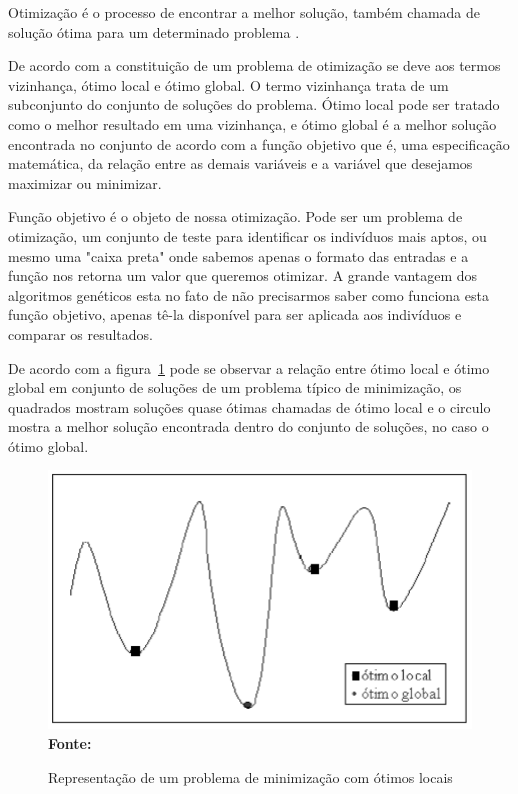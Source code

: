 

Otimização é o processo de encontrar a melhor solução, também chamada de solução ótima para um determinado problema \cite{timoteo2005desenvolvimento}.\par

De acordo com \cite{steiglitz1982combinatorial} a constituição de um problema de otimização se deve aos termos vizinhança, ótimo local e ótimo global. O termo vizinhança trata de um subconjunto do conjunto de soluções do problema. Ótimo local pode ser tratado como o melhor resultado em uma vizinhança, e ótimo global é a melhor solução encontrada no conjunto de acordo com a função objetivo que é, uma especificação matemática, da relação entre as demais variáveis e a variável que desejamos maximizar ou minimizar.\par

Função objetivo é o objeto de nossa otimização. Pode ser um problema de otimização, um conjunto de teste para identificar os indivíduos mais aptos, ou mesmo uma "caixa preta" onde sabemos apenas o formato das entradas e a função nos retorna um valor que queremos otimizar. A grande vantagem dos algoritmos genéticos esta no fato de não precisarmos saber como funciona esta função objetivo, apenas tê-la disponível para ser aplicada aos indivíduos e comparar os resultados.

De acordo com a figura~\ref{fig:representacaoLocal}  pode se observar a relação entre ótimo local e ótimo global em conjunto de soluções de um problema típico de minimização, os quadrados mostram soluções quase ótimas chamadas de ótimo local e o circulo mostra a melhor solução encontrada dentro do conjunto de soluções, no caso o ótimo global.\par

\begin{figure}[!htb]
\caption[Representação de um problema de minimização com ótimos locais]{Representação de um problema de minimização com ótimos locais}
\label{fig:representacaoLocal}
\centering
\includegraphics[scale=0.55]{imagens/problemaOtimizacao.png}
\\ \textbf{\footnotesize Fonte: \cite{timoteo2005desenvolvimento}}
\end{figure}
	
